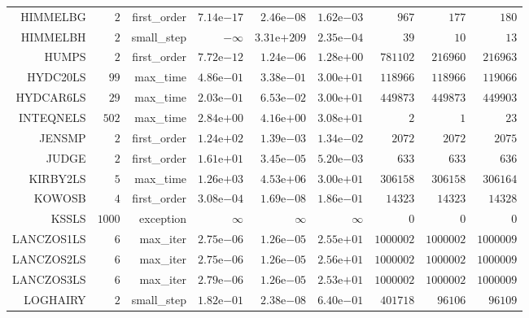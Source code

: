 \begin{longtable}{rrrrrrrrr}
HIMMELBG & \(     2\) & first\_order & \( 7.14\)e\(-17\) & \( 2.46\)e\(-08\) & \( 1.62\)e\(-03\) & \(   967\) & \(   177\) & \(   180\) \\
HIMMELBH & \(     2\) & small\_step & \(-\infty\) & \(3.31\)e\(+209\) & \( 2.35\)e\(-04\) & \(    39\) & \(    10\) & \(    13\) \\
HUMPS & \(     2\) & first\_order & \( 7.72\)e\(-12\) & \( 1.24\)e\(-06\) & \( 1.28\)e\(+00\) & \(781102\) & \(216960\) & \(216963\) \\
HYDC20LS & \(    99\) & max\_time & \( 4.86\)e\(-01\) & \( 3.38\)e\(-01\) & \( 3.00\)e\(+01\) & \(118966\) & \(118966\) & \(119066\) \\
HYDCAR6LS & \(    29\) & max\_time & \( 2.03\)e\(-01\) & \( 6.53\)e\(-02\) & \( 3.00\)e\(+01\) & \(449873\) & \(449873\) & \(449903\) \\
INTEQNELS & \(   502\) & max\_time & \( 2.84\)e\(+00\) & \( 4.16\)e\(+00\) & \( 3.08\)e\(+01\) & \(     2\) & \(     1\) & \(    23\) \\
JENSMP & \(     2\) & first\_order & \( 1.24\)e\(+02\) & \( 1.39\)e\(-03\) & \( 1.34\)e\(-02\) & \(  2072\) & \(  2072\) & \(  2075\) \\
JUDGE & \(     2\) & first\_order & \( 1.61\)e\(+01\) & \( 3.45\)e\(-05\) & \( 5.20\)e\(-03\) & \(   633\) & \(   633\) & \(   636\) \\
KIRBY2LS & \(     5\) & max\_time & \( 1.26\)e\(+03\) & \( 4.53\)e\(+06\) & \( 3.00\)e\(+01\) & \(306158\) & \(306158\) & \(306164\) \\
KOWOSB & \(     4\) & first\_order & \( 3.08\)e\(-04\) & \( 1.69\)e\(-08\) & \( 1.86\)e\(-01\) & \( 14323\) & \( 14323\) & \( 14328\) \\
KSSLS & \(  1000\) & exception & \(\infty\) & \(\infty\) & \(\infty\) & \(     0\) & \(     0\) & \(     0\) \\
LANCZOS1LS & \(     6\) & max\_iter & \( 2.75\)e\(-06\) & \( 1.26\)e\(-05\) & \( 2.55\)e\(+01\) & \(1000002\) & \(1000002\) & \(1000009\) \\
LANCZOS2LS & \(     6\) & max\_iter & \( 2.75\)e\(-06\) & \( 1.26\)e\(-05\) & \( 2.56\)e\(+01\) & \(1000002\) & \(1000002\) & \(1000009\) \\
LANCZOS3LS & \(     6\) & max\_iter & \( 2.79\)e\(-06\) & \( 1.26\)e\(-05\) & \( 2.53\)e\(+01\) & \(1000002\) & \(1000002\) & \(1000009\) \\
LOGHAIRY & \(     2\) & small\_step & \( 1.82\)e\(-01\) & \( 2.38\)e\(-08\) & \( 6.40\)e\(-01\) & \(401718\) & \( 96106\) & \( 96109\) \\

\end{longtable}
